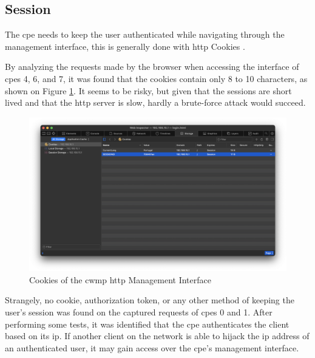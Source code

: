\subsection{Session}

The \gls{cpe} needs to keep the user authenticated while navigating through the management interface, this is generally done with \gls{http} Cookies \cite{rfc6265}.

By analyzing the requests made by the browser when accessing the interface of \glspl{cpe} 4, 6, and 7, it was found that the cookies contain only 8 to 10 characters, as shown on Figure \ref{figure:cpe_cookies}. It seems to be risky, but given that the sessions are short lived and that the \gls{http} server is slow, hardly a brute-force attack would succeed.

\begin{figure}[h]
    \centering
    \includegraphics[width=\linewidth]{contents/http-management-interface-analysis/session/cpe-cookies.png}
    \caption{Cookies of the \gls{cwmp} \gls{http} Management Interface}
    \label{figure:cpe_cookies}
\end{figure}

Strangely, no cookie, authorization token, or any other method of keeping the user’s session was found on the captured requests of \glspl{cpe} 0 and 1. After performing some tests, it was identified that the \gls{cpe} authenticates the client based on its \gls{ip}. If another client on the network is able to hijack the \gls{ip} address of an authenticated user, it may gain access over the \gls{cpe}’s management interface.

\FloatBarrier
